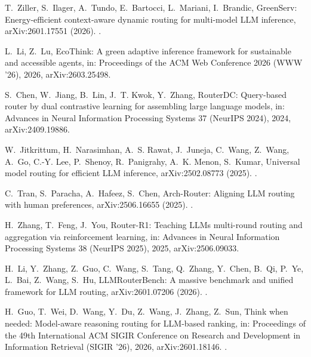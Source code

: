 \documentclass[final,5p,times,twocolumn]{elsarticle}
\theoremstyle{plain}
\begin{document}
T.~Ziller, S.~Ilager, A.~Tundo, E.~Bartocci, L.~Mariani, I.~Brandic,
  {GreenServ}: Energy-efficient context-aware dynamic routing for multi-model
  {LLM} inference, arXiv:2601.17551 (2026).
\newblock \href {http://arxiv.org/abs/2601.17551} {}.

L.~Li, Z.~Lu, {EcoThink}: A green adaptive inference framework for sustainable
  and accessible agents, in: Proceedings of the ACM Web Conference 2026 (WWW
  '26), 2026, arXiv:2603.25498.

S.~Chen, W.~Jiang, B.~Lin, J.~T. Kwok, Y.~Zhang, {RouterDC}: Query-based router
  by dual contrastive learning for assembling large language models, in:
  Advances in Neural Information Processing Systems 37 (NeurIPS 2024), 2024,
  arXiv:2409.19886.

W.~Jitkrittum, H.~Narasimhan, A.~S. Rawat, J.~Juneja, C.~Wang, Z.~Wang, A.~Go,
  C.-Y. Lee, P.~Shenoy, R.~Panigrahy, A.~K. Menon, S.~Kumar, Universal model
  routing for efficient {LLM} inference, arXiv:2502.08773 (2025).
\newblock \href {http://arxiv.org/abs/2502.08773} {}.

C.~Tran, S.~Paracha, A.~Hafeez, S.~Chen, {Arch-Router}: Aligning {LLM} routing
  with human preferences, arXiv:2506.16655 (2025).
\newblock \href {http://arxiv.org/abs/2506.16655} {}.

H.~Zhang, T.~Feng, J.~You, {Router-R1}: Teaching {LLMs} multi-round routing and
  aggregation via reinforcement learning, in: Advances in Neural Information
  Processing Systems 38 (NeurIPS 2025), 2025, arXiv:2506.09033.

H.~Li, Y.~Zhang, Z.~Guo, C.~Wang, S.~Tang, Q.~Zhang, Y.~Chen, B.~Qi, P.~Ye,
  L.~Bai, Z.~Wang, S.~Hu, {LLMRouterBench}: A massive benchmark and unified
  framework for {LLM} routing, arXiv:2601.07206 (2026).
\newblock \href {http://arxiv.org/abs/2601.07206} {}.

H.~Guo, T.~Wei, D.~Wang, Y.~Du, Z.~Wang, J.~Zhang, Z.~Sun, Think when needed:
  Model-aware reasoning routing for {LLM}-based ranking, in: Proceedings of the
  49th International ACM SIGIR Conference on Research and Development in
  Information Retrieval (SIGIR '26), 2026, arXiv:2601.18146.
\newblock \href {https://doi.org/10.1145/3805712.3809709}
  {}.
\end{document}
